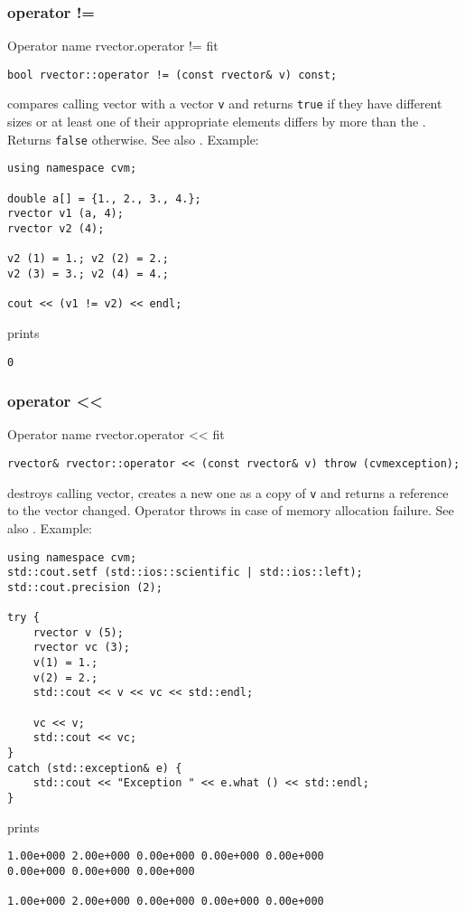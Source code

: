 \subsubsection{operator !=}
Operator%
\pdfdest name {rvector.operator !=} fit
\begin{verbatim}
bool rvector::operator != (const rvector& v) const;
\end{verbatim}
compares calling vector with a vector \verb"v"
and returns \verb"true" if they have different sizes
or at least one of their appropriate elements
differs by more than the
.
Returns \verb"false" otherwise.
See also .
Example:
\begin{Verbatim}
using namespace cvm;

double a[] = {1., 2., 3., 4.};
rvector v1 (a, 4);
rvector v2 (4);

v2 (1) = 1.; v2 (2) = 2.;
v2 (3) = 3.; v2 (4) = 4.;

cout << (v1 != v2) << endl;
\end{Verbatim}
prints
\begin{Verbatim}
0
\end{Verbatim}
\newpage



\subsubsection{operator <{}<}
Operator%
\pdfdest name {rvector.operator <<} fit
\begin{verbatim}
rvector& rvector::operator << (const rvector& v) throw (cvmexception);
\end{verbatim}
destroys calling vector, creates a new one as a copy of \verb"v"
and returns a reference to the vector changed.
Operator throws  
in case of memory allocation failure.
See also .
Example:
\begin{Verbatim}
using namespace cvm;
std::cout.setf (std::ios::scientific | std::ios::left); 
std::cout.precision (2);

try {
    rvector v (5);
    rvector vc (3);
    v(1) = 1.;
    v(2) = 2.;
    std::cout << v << vc << std::endl;

    vc << v;
    std::cout << vc;
}
catch (std::exception& e) {
    std::cout << "Exception " << e.what () << std::endl;
}
\end{Verbatim}
prints
\begin{Verbatim}
1.00e+000 2.00e+000 0.00e+000 0.00e+000 0.00e+000
0.00e+000 0.00e+000 0.00e+000

1.00e+000 2.00e+000 0.00e+000 0.00e+000 0.00e+000
\end{Verbatim}
\newpage


